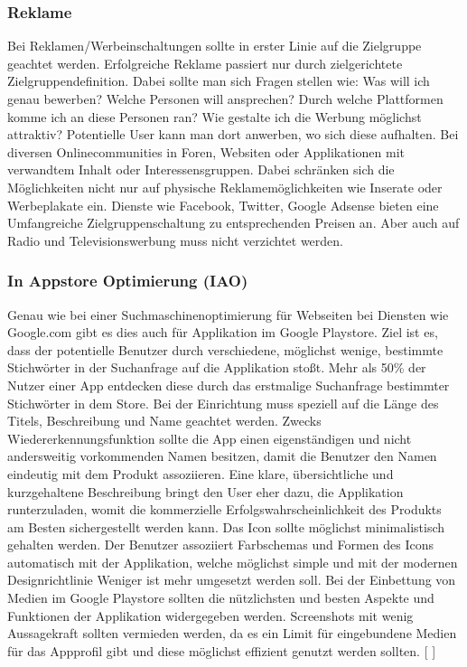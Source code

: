 \documentclass[FIPLY_base.tex]{subfiles}
\begin{document}
\subsubsection{Reklame}
Bei Reklamen/Werbeinschaltungen sollte in erster Linie auf die Zielgruppe geachtet werden. Erfolgreiche Reklame passiert nur durch zielgerichtete Zielgruppendefinition. Dabei sollte man sich Fragen stellen wie: Was will ich genau bewerben? Welche Personen will ansprechen? Durch welche Plattformen komme ich an diese Personen ran? Wie gestalte ich die Werbung möglichst attraktiv? \newline
Potentielle User kann man dort anwerben, wo sich diese aufhalten. Bei diversen Onlinecommunities in Foren, Websiten oder Applikationen mit verwandtem Inhalt oder Interessensgruppen. Dabei schränken sich die Möglichkeiten nicht nur auf physische Reklamemöglichkeiten wie Inserate oder Werbeplakate ein. Dienste wie Facebook, Twitter, Google Adsense bieten eine Umfangreiche Zielgruppenschaltung zu entsprechenden Preisen an. Aber auch auf Radio und Televisionswerbung muss nicht verzichtet werden.


\subsubsection{In Appstore Optimierung (IAO)}
Genau wie bei einer Suchmaschinenoptimierung für Webseiten bei Diensten wie Google.com gibt es dies auch für Applikation im Google Playstore. Ziel ist es, dass der potentielle Benutzer durch verschiedene, möglichst wenige, bestimmte Stichwörter in der Suchanfrage auf die Applikation stoßt. Mehr als 50\% der Nutzer einer App entdecken diese durch das erstmalige Suchanfrage bestimmter Stichwörter in dem Store.
\newline
Bei der Einrichtung muss speziell auf die Länge des Titels, Beschreibung und Name geachtet werden. Zwecks Wiedererkennungsfunktion sollte die App einen eigenständigen und nicht andersweitig vorkommenden Namen besitzen, damit die Benutzer den Namen eindeutig mit dem Produkt assoziieren. Eine klare, übersichtliche und kurzgehaltene Beschreibung bringt den User eher dazu, die Applikation runterzuladen, womit die kommerzielle Erfolgswahrscheinlichkeit des Produkts am Besten sichergestellt werden kann. 
\newline
Das Icon sollte möglichst minimalistisch gehalten werden. Der Benutzer assoziiert Farbschemas und Formen des Icons automatisch mit der Applikation, welche möglichst simple und mit der modernen Designrichtlinie \grqq{}Weniger ist mehr\grqq{} umgesetzt werden soll. 
\newline
Bei der Einbettung von Medien im Google Playstore sollten die nützlichsten und besten Aspekte und Funktionen der Applikation widergegeben werden. Screenshots mit wenig Aussagekraft sollten vermieden werden, da es ein Limit für eingebundene Medien für das Appprofil gibt und diese möglichst effizient genutzt werden sollten.
[ \cite{promteil2}]
\end{document}
